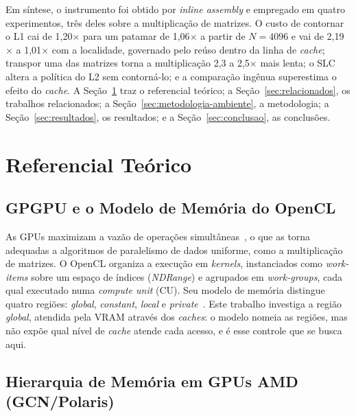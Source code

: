 \documentclass[12pt]{article}
\begin{document}
Em síntese, o instrumento foi obtido por \textit{inline assembly} e empregado em quatro experimentos, três deles sobre a multiplicação de matrizes. O custo de contornar o L1 cai de 1,20$\times$ para um patamar de 1,06$\times$ a partir de $N=4096$ e vai de 2,19$\times$ a 1,01$\times$ com a localidade, governado pelo reúso dentro da linha de \textit{cache}; transpor uma das matrizes torna a multiplicação 2,3 a 2,5$\times$ mais lenta; o SLC altera a política do L2 sem contorná-lo; e a comparação ingênua superestima o efeito do \textit{cache}. A Seção~\ref{sec:referencial} traz o referencial teórico; a Seção~\ref{sec:relacionados}, os trabalhos relacionados; a Seção~\ref{sec:metodologia-ambiente}, a metodologia; a Seção~\ref{sec:resultados}, os resultados; e a Seção~\ref{sec:conclusao}, as conclusões.

\section{Referencial Teórico}
\label{sec:referencial}

\subsection{GPGPU e o Modelo de Memória do OpenCL}

As GPUs maximizam a vazão de operações simultâneas~\cite{owens2008}, o que as torna adequadas a algoritmos de paralelismo de dados uniforme, como a multiplicação de matrizes. O OpenCL organiza a execução em \textit{kernels}, instanciados como \textit{work-items} sobre um espaço de índices (\textit{NDRange}) e agrupados em \textit{work-groups}, cada qual executado numa \textit{compute unit} (CU). Seu modelo de memória distingue quatro regiões: \textit{global}, \textit{constant}, \textit{local} e \textit{private}~\cite{stone2010}. Este trabalho investiga a região \textit{global}, atendida pela VRAM através dos \textit{caches}: o modelo nomeia as regiões, mas não expõe qual nível de \textit{cache} atende cada acesso, e é esse controle que se busca aqui.

\subsection{Hierarquia de Memória em GPUs AMD (GCN/Polaris)}
\label{sec:hier}
\end{document}
